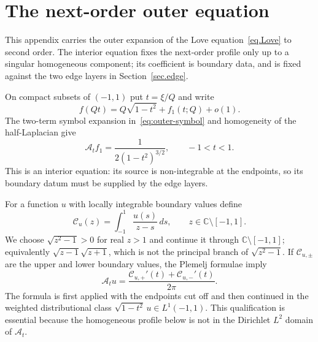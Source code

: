 \documentclass[11pt,a4paper]{article}
\theoremstyle{definition}
\begin{document}
\section{The next-order outer equation}
\label{app.density}
This appendix carries the outer expansion of the Love
equation~\eqref{eq.Love} to second order.  The interior equation fixes the
next-order profile only up to a singular homogeneous component; its
coefficient is boundary data, and is fixed against the two edge layers in
Section~\ref{sec.edge}.

On compact subsets of $(-1,1)$ put $t=\xi/Q$ and write
\begin{equation}\label{eq.f-outer-expansion-app}
  f(Qt)=Q\sqrt{1-t^2}+f_1(t;Q)+o(1).
\end{equation}
The two-term symbol expansion in~\eqref{eq:outer-symbol} and homogeneity of
the half-Laplacian give
\begin{equation}\label{eq.f1-scaled-new}
  \mathcal A_t f_1=\frac{1}{2(1-t^2)^{3/2}},\qquad -1<t<1.
\end{equation}
This is an interior equation: its source is non-integrable at the endpoints,
so its boundary datum must be supplied by the edge layers.

For a function $u$ with locally integrable boundary values define
\begin{equation}\label{eq.cauchy-transform-app}
  \mathscr C_u(z)=\int_{-1}^{1}\frac{u(s)}{z-s}\,ds,
  \qquad z\in\mathbb C\setminus[-1,1].
\end{equation}
We choose $\sqrt{z^2-1}>0$ for real $z>1$ and continue it through
$\mathbb C\setminus[-1,1]$; equivalently $\sqrt{z-1}\sqrt{z+1}$, which is not
the principal branch of $\sqrt{z^2-1}$.  If $\mathscr C_{u,\pm}$ are the upper and lower
boundary values, the Plemelj formulae imply
\begin{equation}\label{eq.A-cauchy-new}
  \mathcal A_tu=
  \frac{\mathscr C_{u,+}'(t)+\mathscr C_{u,-}'(t)}{2\pi}.
\end{equation}
The formula is first applied with the endpoints cut off and then continued in
the weighted distributional class $\sqrt{1-t^2}\,u\in L^1(-1,1)$.  This
qualification is essential because the homogeneous profile below is not in
the Dirichlet $L^2$ domain of $\mathcal A_t$.
\end{document}

